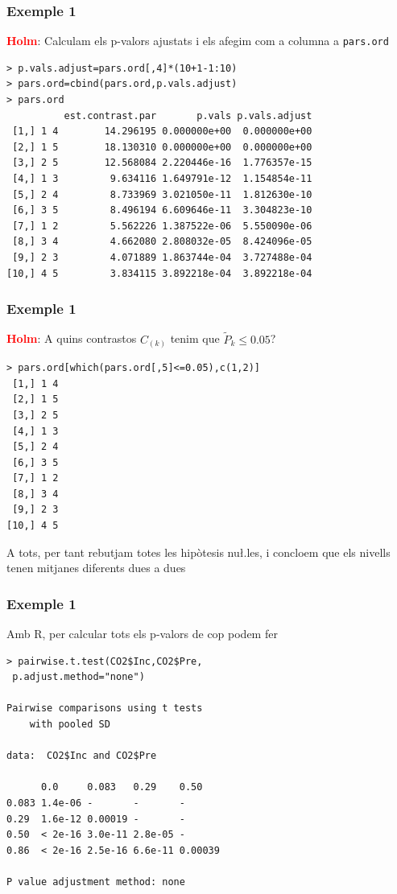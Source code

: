 \documentclass[12pt,t]{beamer}
\newcommand{\red}[1]{\textcolor{red}{#1}}
\renewcommand{\leq}{\leqslant}
\theoremstyle{plain}
\theoremstyle{definition}
\begin{document}
\begin{frame}[fragile]
\frametitle{Exemple 1}
\vspace*{-2ex}

\red{\bf Holm}: Calculam els p-valors ajustats i els afegim com a columna a \texttt{pars.ord} 
{\footnotesize \begin{verbatim}
> p.vals.adjust=pars.ord[,4]*(10+1-1:10)
> pars.ord=cbind(pars.ord,p.vals.adjust)
> pars.ord
          est.contrast.par       p.vals p.vals.adjust
 [1,] 1 4        14.296195 0.000000e+00  0.000000e+00
 [2,] 1 5        18.130310 0.000000e+00  0.000000e+00
 [3,] 2 5        12.568084 2.220446e-16  1.776357e-15
 [4,] 1 3         9.634116 1.649791e-12  1.154854e-11
 [5,] 2 4         8.733969 3.021050e-11  1.812630e-10
 [6,] 3 5         8.496194 6.609646e-11  3.304823e-10
 [7,] 1 2         5.562226 1.387522e-06  5.550090e-06
 [8,] 3 4         4.662080 2.808032e-05  8.424096e-05
 [9,] 2 3         4.071889 1.863744e-04  3.727488e-04
[10,] 4 5         3.834115 3.892218e-04  3.892218e-04
\end{verbatim}
}
\end{frame}




\begin{frame}[fragile]
\frametitle{Exemple 1}
\vspace*{-2ex}

\red{\bf Holm}: A quins contrastos $C_{(k)}$ tenim que $\widetilde{P}_{k}\leq 0.05$?
{\small \begin{verbatim}
> pars.ord[which(pars.ord[,5]<=0.05),c(1,2)]  
 [1,] 1 4
 [2,] 1 5
 [3,] 2 5
 [4,] 1 3
 [5,] 2 4
 [6,] 3 5
 [7,] 1 2
 [8,] 3 4
 [9,] 2 3
[10,] 4 5
\end{verbatim}
}
A tots, per tant rebutjam totes les hipòtesis nu\l.les, i concloem que els nivells tenen mitjanes diferents dues a dues

\end{frame}


\begin{frame}[fragile]
\frametitle{Exemple 1}

Amb R, per calcular tots els p-valors de cop podem  fer 
{\small \begin{verbatim}
> pairwise.t.test(CO2$Inc,CO2$Pre,
 p.adjust.method="none")

Pairwise comparisons using t tests 
	with pooled SD 

data:  CO2$Inc and CO2$Pre 

      0.0     0.083   0.29    0.50   
0.083 1.4e-06 -       -       -      
0.29  1.6e-12 0.00019 -       -      
0.50  < 2e-16 3.0e-11 2.8e-05 -      
0.86  < 2e-16 2.5e-16 6.6e-11 0.00039

P value adjustment method: none 
\end{verbatim}
}


\end{frame}
\end{document}

